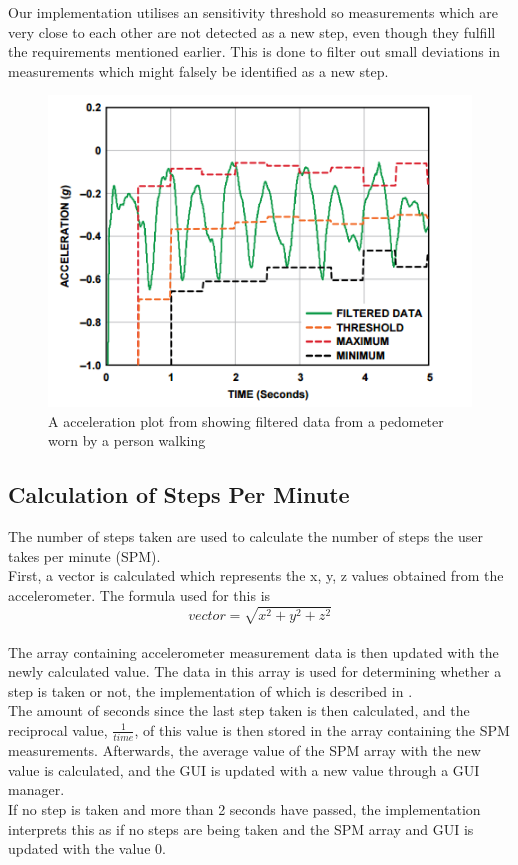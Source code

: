Our implementation utilises an sensitivity threshold so measurements which are very close to each other are not detected as a new step, even though they fulfill the requirements mentioned earlier. This is done to filter out small deviations in measurements which might falsely be identified as a new step.
\begin{figure}[h!]
  \centering
    \includegraphics[scale=0.8]{Images/accPlot.png}
  \caption{A acceleration plot from \citet[p. 2]{zhao:pedometer} showing filtered data from a pedometer worn by a person walking}
  \label{fig:zhaoGraph}
\end{figure}
\subsection{Calculation of Steps Per Minute}
The number of steps taken are used to calculate the number of steps the user takes per minute (SPM).\\

First, a vector is calculated which represents the x, y, z values obtained from the accelerometer. The formula used for this is $$vector = \sqrt{x^{2} + y^{2} + z^{2}}$$\\

The array containing accelerometer measurement data is then updated with the newly calculated value. The data in this array is used for determining whether a step is taken or not, the implementation of which is described in .\\

The amount of seconds since the last step taken is then calculated, and the reciprocal value, $\frac{1}{time}$, of this value is then stored in the array containing the SPM measurements. Afterwards, the average value of the SPM array with the new value is calculated, and the GUI is updated with a new value through a GUI manager.\\

If no step is taken and more than 2 seconds have passed, the implementation interprets this as if no steps are being taken and the SPM array and GUI is updated with the value 0.